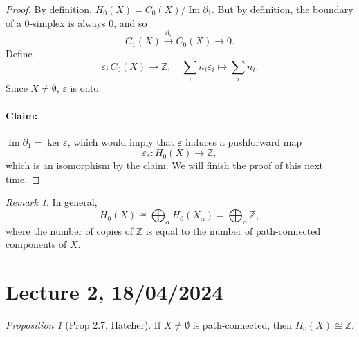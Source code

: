 \documentclass[a4paper]{report}
\theoremstyle{definition}
\theoremstyle{remark}
\newtheorem{remark}{Remark}
\theoremstyle{proposition}
\newtheorem{proposition}{Proposition}
\theoremstyle{conjecture}
\theoremstyle{lemma}
\theoremstyle{corollary}
\theoremstyle{exercise}
\newcommand{\on}{\operatorname}
\begin{document}
\begin{proof}
    By definition. $H_0(X) = C_0(X) / \on{Im}\partial_1$. 
    But by definition, the boundary of a $0$-simplex is always $0$, and so 
    $$C_1(X) \stackrel{\partial_1}{\longrightarrow} C_0(X) \longrightarrow 0.$$
    Define $$\varepsilon:  C_0(X) \longrightarrow \mathbb{Z},\quad \sum_i n_i\varepsilon_i \longmapsto \sum_i n_i.$$ 
    Since $X \neq \emptyset$, $\varepsilon$ is onto.
    \paragraph{Claim:} $\on{Im} \partial_1 = \ker \varepsilon$, which would imply that $\varepsilon$ 
    induces a pushforward map 
    $$\varepsilon_\ast : H_0(X) \longrightarrow \mathbb{Z},$$ 
    which is an isomorphism by the claim. We will finish the proof of this next time.
\end{proof}

\begin{remark}
    In general, 
    $$H_0(X) \cong \bigoplus_\alpha H_0(X_\alpha) = \bigoplus_\alpha \mathbb{Z},$$
    where the number of copies of $\mathbb{Z}$ is equal to the number of path-connected 
    components of $X$.
\end{remark}

\section{Lecture 2, 18/04/2024}

\begin{proposition}[Prop 2.7, Hatcher]
    If $X\neq \emptyset$ is path-connected, then $H_0(X) \cong \mathbb{Z}$.
\end{proposition}
\end{document}
